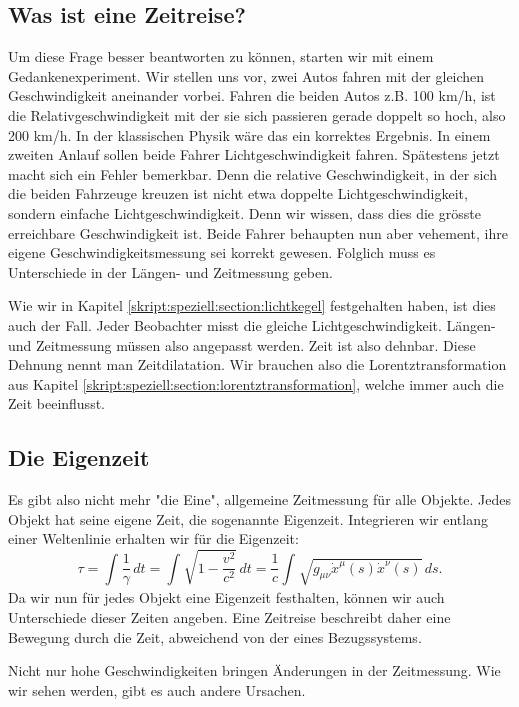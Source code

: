 \begin{refsection}
\section{Was ist eine Zeitreise?}
Um diese Frage besser beantworten zu können, starten wir mit einem Gedankenexperiment. Wir stellen uns vor, zwei Autos fahren mit der gleichen Geschwindigkeit aneinander vorbei. Fahren die beiden Autos z.B. 100 km/h, ist die Relativgeschwindigkeit mit der sie sich passieren gerade doppelt so hoch, also 200 km/h. In der klassischen Physik wäre das ein korrektes Ergebnis. In einem zweiten Anlauf sollen beide Fahrer Lichtgeschwindigkeit fahren. Spätestens jetzt macht sich ein Fehler bemerkbar. Denn die relative Geschwindigkeit, in der sich die beiden Fahrzeuge kreuzen ist nicht etwa doppelte Lichtgeschwindigkeit, sondern einfache Lichtgeschwindigkeit. Denn wir wissen, dass dies die grösste erreichbare Geschwindigkeit ist.
Beide Fahrer behaupten nun aber vehement, ihre eigene Geschwindigkeitsmessung sei korrekt gewesen. Folglich muss es Unterschiede in der Längen- und Zeitmessung geben.

Wie wir in Kapitel \ref{skript:speziell:section:lichtkegel} festgehalten haben, ist dies auch der Fall. Jeder Beobachter misst die gleiche Lichtgeschwindigkeit. Längen- und Zeitmessung müssen also angepasst werden. Zeit ist also dehnbar. Diese Dehnung nennt man Zeitdilatation. Wir brauchen also die Lorentztransformation aus Kapitel \ref{skript:speziell:section:lorentztransformation}, welche immer auch die Zeit beeinflusst.

\subsection{Die Eigenzeit}
Es gibt also nicht mehr "die Eine", allgemeine Zeitmessung für alle Objekte. Jedes Objekt hat seine eigene Zeit, die sogenannte Eigenzeit.
Integrieren wir entlang einer Weltenlinie erhalten wir für die Eigenzeit:
\begin{equation}\label{Eigenzeit}
\tau
=
\int_{}^{}\frac{1}{\gamma}\,dt=\int_{}^{}\sqrt{1-\frac{v^2}{c^2}}\,dt
=
\frac{1}{c}\int_{}^{}\sqrt{g_{\mu\nu}\dot{x}^{\mu}(s)\dot{x}^{\nu}(s)}\,ds.
\end{equation}
Da wir nun für jedes Objekt eine Eigenzeit festhalten, können wir auch Unterschiede dieser Zeiten angeben.
Eine Zeitreise beschreibt daher eine Bewegung durch die Zeit, abweichend von der eines Bezugssystems. 

Nicht nur hohe Geschwindigkeiten bringen Änderungen in der Zeitmessung. Wie wir sehen werden, gibt es auch andere Ursachen.


\end{refsection}
